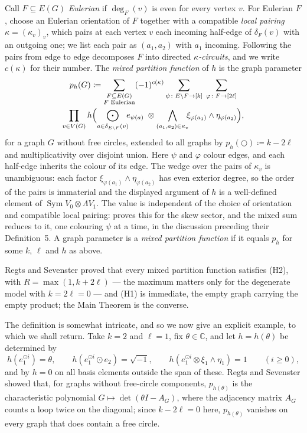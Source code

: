 \documentclass[11pt]{article}
\newcommand{\freecircle}{\bigcirc}
\newcommand{\halfedges}[2]{\delta_{#1}(#2)}       %
\newcommand{\SymV}{\operatorname{Sym}}
\begin{document}
Call $F\subseteq E(G)$ \emph{Eulerian} if $\deg_{F}(v)$ is even for
every vertex $v$. For Eulerian $F$, choose an Eulerian orientation
of $F$ together with a compatible \emph{local pairing}
$\kappa=(\kappa_{v})_{v}$, which pairs at each vertex $v$ each
incoming half-edge of $\halfedges{F}{v}$ with an outgoing one; we
list each pair as $(a_{1},a_{2})$ with $a_{1}$ incoming. Following
the pairs from edge to edge decomposes $F$ into directed
\emph{$\kappa$-circuits}, and we write $c(\kappa)$ for their
number. The
\emph{mixed partition function} of $h$ is the graph parameter
\begin{multline*}
p_{h}(G)\coloneqq
\sum_{\substack{F\subseteq E(G)\\ F\text{ Eulerian}}}
(-1)^{c(\kappa)}
\sum_{\psi\colon E\setminus F\to[k]}\;
\sum_{\varphi\colon F\to[2\ell]}\\
\prod_{v\in V(G)}
h\Bigl(
\bigodot_{a\in\halfedges{E\setminus F}{v}}\hspace{-1ex}e_{\psi(a)}
\;\otimes
\bigwedge_{(a_{1},a_{2})\in\kappa_{v}}\hspace{-1ex}
\xi_{\varphi(a_{1})}\wedge\eta_{\varphi(a_{2})}
\Bigr),
\end{multline*}
for a graph $G$ without free circles, extended to all graphs by
$p_{h}(\freecircle)\coloneqq k-2\ell$ and multiplicativity over
disjoint union. Here $\psi$ and $\varphi$ colour edges, and each
half-edge inherits the colour of its edge. The wedge over the
pairs of $\kappa_{v}$ is unambiguous: each factor
$\xi_{\varphi(a_{1})}\wedge\eta_{\varphi(a_{2})}$ has even
exterior degree, so the order of the pairs is immaterial and the
displayed argument of $h$ is a well-defined element of
$\SymV V_{0}\otimes\Lambda V_{1}$. The value is independent
of the choice of orientation and compatible local pairing:
\cite[Proposition~3]{RS21} proves this for the skew sector, and
the mixed sum reduces to it, one colouring $\psi$ at a time, in
the discussion preceding their Definition~5. A graph parameter is a \emph{mixed
partition function} if it equals $p_{h}$ for some $k$, $\ell$ and
$h$ as above.

Regts and Sevenster proved that every mixed partition function
satisfies (H2), with $R=\max(1,k+2\ell)$
\cite[Theorem~6]{RS21} --- the maximum matters only for the
degenerate model with $k=2\ell=0$ --- and (H1) is immediate, the
empty graph carrying the empty product; the Main Theorem is the
converse.

The definition is somewhat intricate, and so we now give an
explicit example, to which we shall return. Take $k=2$ and
$\ell=1$, fix $\theta\in\mathbb{C}$, and let
$h=h(\theta)$ be determined by
\[
h(e_{1}^{\odot i})=\theta,\qquad
h(e_{1}^{\odot i}\odot e_{2})=\sqrt{-1},\qquad
h(e_{1}^{\odot i}\otimes \xi_{1}\wedge\eta_{1})=1
\qquad(i\ge 0),
\]
and by $h=0$ on all basis elements outside the span of these. Regts
and Sevenster showed \cite[Proposition~10]{RS21} that, for graphs
without free-circle components, $p_{h(\theta)}$ is the
characteristic polynomial $G\mapsto\det(\theta I-A_{G})$, where
the adjacency matrix $A_{G}$ counts a loop twice on the diagonal;
since $k-2\ell=0$ here, $p_{h(\theta)}$ vanishes on every graph
that does contain a free circle.
\end{document}
